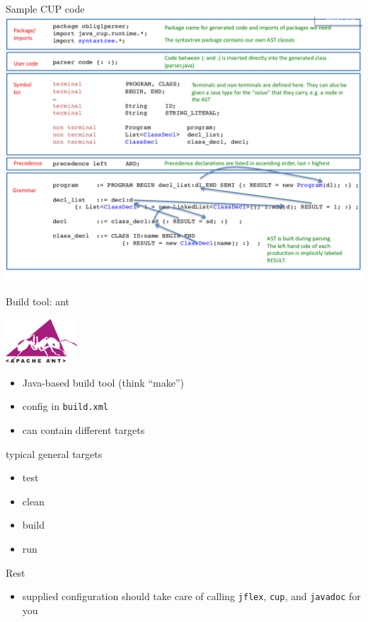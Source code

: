 \documentclass{beamer}
\begin{document}
\begin{frame}[label={sec:orgc429da0}]{Sample CUP code}
\includegraphics[width=\textwidth]{figures/snaps/cupcode}
\end{frame}



\begin{frame}[label={sec:org2c73764},fragile]{Build tool: ant}

 \begin{center}
 \includegraphics[width=0.2\textwidth]{figures/snaps/antlogo}
\end{center}


\begin{itemize}
\item Java-based build tool (think ``make'')
\item config in \texttt{build.xml}
\item can contain different \alert{targets}
\end{itemize}

\begin{block}{typical general targets}
\begin{itemize}
\item test
\item clean
\item build
\item run
\end{itemize}
\end{block}

\begin{block}{Rest}
\begin{itemize}
\item supplied configuration should take care of calling \texttt{jflex}, \texttt{cup}, and
\texttt{javadoc} for you
\end{itemize}
\end{block}
\end{frame}
\end{document}
